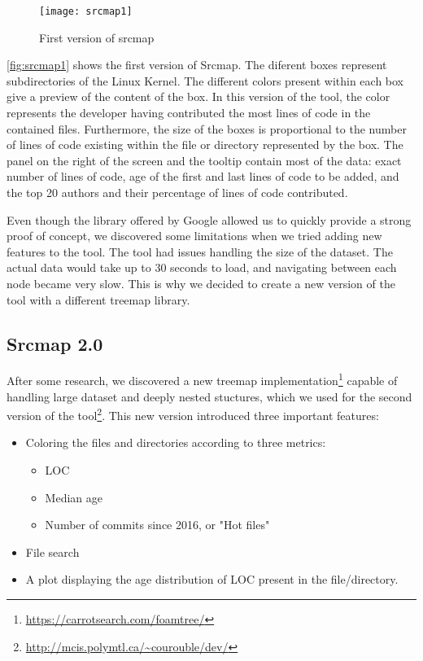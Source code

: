 \begin{figure}[htb]
\centering
\texttt{[image: srcmap1]}
\caption{First version of srcmap}
\label{fig:srcmap1}
\end{figure}

\autoref{fig:srcmap1} shows the first version of Srcmap. The diferent boxes represent subdirectories of the Linux Kernel. The different colors present within each box give a preview of the content of the box. In this version of the tool, the color represents the developer having contributed the most lines of code in the contained files. Furthermore, the size of the boxes is proportional to the number of lines of code existing within the file or directory represented by the box. The panel on the right of the screen and the tooltip contain most of the data: exact number of lines of code, age of the first and last lines of code to be added, and the top 20 authors and their percentage of lines of code contributed.

Even though the library offered by Google allowed us to quickly provide a strong proof of concept, we discovered some limitations when we tried adding new features to the tool. The tool had issues handling the size of the dataset. The actual data would take up to 30 seconds to load, and navigating between each node became very slow. This is why we decided to create a new version of the tool with a different treemap library.


\subsection{Srcmap 2.0}


After some research, we discovered a new treemap implementation\footnote{\url{https://carrotsearch.com/foamtree/}} capable of handling large dataset and deeply nested stuctures, which we used for the second version of the tool\footnote{\url{http://mcis.polymtl.ca/~courouble/dev/}}. This new version introduced three important features: 
\begin{itemize}
	\item Coloring the files and directories according to three metrics:
	\begin{itemize}
		\item LOC
		\item Median age
		\item Number of commits since 2016, or "Hot files"
	\end{itemize}
	\item File search
	\item A plot displaying the age distribution of LOC present in the file/directory.
\end{itemize}


